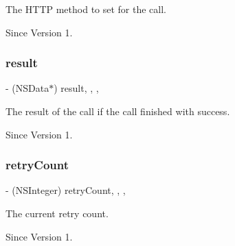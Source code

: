The H\+T\+TP method to set for the call. 

\begin{DoxySince}{Since}
Version 1. 
\end{DoxySince}
\hypertarget{category_x_i_robust_r_e_s_t_call_07_08_af60c21d6c194a2bb5a3758993e9d6a3d}{}\label{category_x_i_robust_r_e_s_t_call_07_08_af60c21d6c194a2bb5a3758993e9d6a3d} 
\subsubsection{\texorpdfstring{result}{result}}
{\footnotesize\ttfamily -\/ (N\+S\+Data$\ast$) result\hspace{0.3cm}{\ttfamily [read]}, {\ttfamily [write]}, {\ttfamily [nonatomic]}, {\ttfamily [strong]}}



The result of the call if the call finished with success. 

\begin{DoxySince}{Since}
Version 1. 
\end{DoxySince}
\hypertarget{category_x_i_robust_r_e_s_t_call_07_08_a8746f2e98cc9cf9ef30e07106fa39935}{}\label{category_x_i_robust_r_e_s_t_call_07_08_a8746f2e98cc9cf9ef30e07106fa39935} 
\subsubsection{\texorpdfstring{retry\+Count}{retryCount}}
{\footnotesize\ttfamily -\/ (N\+S\+Integer) retry\+Count\hspace{0.3cm}{\ttfamily [read]}, {\ttfamily [write]}, {\ttfamily [nonatomic]}, {\ttfamily [assign]}}



The current retry count. 

\begin{DoxySince}{Since}
Version 1. 
\end{DoxySince}
\hypertarget{category_x_i_robust_r_e_s_t_call_07_08_a1d70fa158b2c2c826c6001d95ebc50e5}{}\label{category_x_i_robust_r_e_s_t_call_07_08_a1d70fa158b2c2c826c6001d95ebc50e5} 

